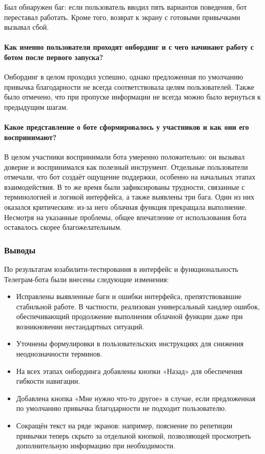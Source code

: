\documentclass[pdflatex,sn-mathphys-num]{sn-jnl}%
\theoremstyle{thmstyleone}%
\theoremstyle{thmstyletwo}%
\theoremstyle{thmstylethree}%
\begin{document}
Был обнаружен баг: если пользователь вводил пять вариантов поведения, бот переставал работать. Кроме того, возврат к экрану с готовыми привычками вызывал сбой.

\paragraph{Как именно пользователи проходят онбординг и с чего начинают работу с ботом после первого запуска?}

Онбординг в целом проходил успешно, однако предложенная по умолчанию привычка благодарности не всегда соответствовала целям пользователей. Также было отмечено, что при пропуске информации не всегда можно было вернуться к предыдущим шагам.

\paragraph{Какое представление о боте сформировалось у участников и как они его воспринимают?}

В целом участники воспринимали бота умеренно положительно: он вызывал доверие и воспринимался как полезный инструмент. Отдельные пользователи отмечали, что бот создаёт ощущение поддержки, особенно на начальных этапах взаимодействия. В то же время были зафиксированы трудности, связанные с терминологией и логикой интерфейса, а также выявлены три бага. Один из них оказался критическим: из-за него облачная функция прекращала выполнение. Несмотря на указанные проблемы, общее впечатление от использования бота оставалось скорее благожелательным.

\subsubsection{Выводы}

По результатам юзабилити-тестирования в интерфейс и функциональность Телеграм-бота были внесены следующие изменения:

\begin{itemize}
\item Исправлены выявленные баги и ошибки интерфейса, препятствовавшие стабильной работе. В частности, реализован универсальный хандлер ошибок, обеспечивающий продолжение выполнения облачной функции даже при возникновении нестандартных ситуаций.
\item Уточнены формулировки в пользовательских инструкциях для снижения неоднозначности терминов.
\item На всех этапах онбординга добавлены кнопки «Назад» для обеспечения гибкости навигации.
\item Добавлена кнопка «Мне нужно что-то другое» в случае, если предложенная по умолчанию привычка благодарности не подходит пользователю.
\item Сокращён текст на ряде экранов: например, пояснение по репетиции привычки теперь скрыто за отдельной кнопкой, позволяющей просмотреть дополнительную информацию при необходимости.
\end{itemize}
\end{document}
